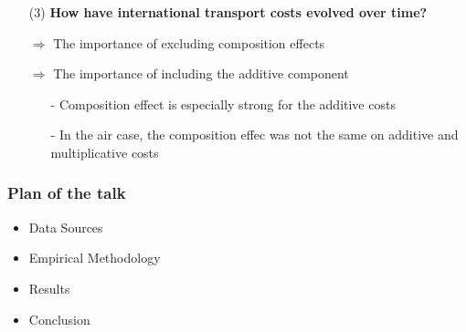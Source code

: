 \documentclass[10 pt,Helvetica, french]{beamer}
\begin{document}
\begin{frame}
\begin{itemize}
\item[(3)] \textbf{ How have international transport costs evolved over time?} \vspace{0.2cm}
\item[$\Rightarrow$] The importance of excluding composition effects \vspace{0.2cm}
\item[$\Rightarrow$] The importance of including the additive component \vspace{0.2cm}
\begin{itemize}
\item[-] Composition effect is especially strong for the additive costs \vspace{0.2cm}
\item[-] In the air case, the composition effec was not the same on additive and multiplicative costs
\end{itemize}
\end{itemize}
\end{frame}

\begin{frame}
\frametitle{Plan of the talk}
\begin{itemize}
\item Data Sources  \vspace{0.2cm}
\item Empirical Methodology \vspace{0.2cm}
\item Results \vspace{0.2cm}
\item Conclusion
\end{itemize}
\end{frame}
\end{document}
